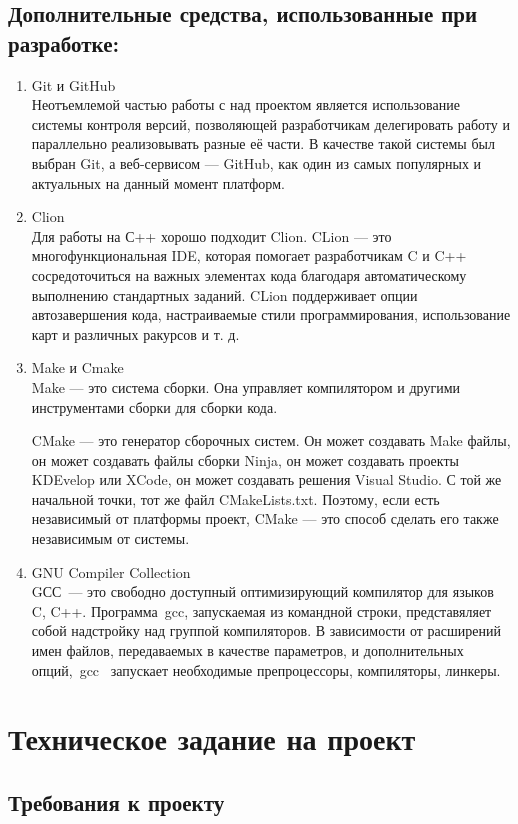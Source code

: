 \documentclass[a4paper,14pt,oneside]{extreport}  %
\begin{document}
\section{Дополнительные средства, использованные при разработке:}
\begin{enumerate}
	\item Git и GitHub\\
	Неотъемлемой частью работы с над проектом является использование системы контроля версий, позволяющей разработчикам делегировать работу и параллельно реализовывать разные её части. В качестве такой системы был выбран Git, а веб-сервисом — GitHub, как один из самых популярных и актуальных на данный момент платформ.
	\item Clion\\
	Для работы на С++ хорошо подходит Clion. CLion — это многофункциональная IDE, которая помогает разработчикам C и C++ сосредоточиться на важных элементах кода благодаря автоматическому выполнению стандартных заданий.  CLion поддерживает опции автозавершения кода, настраиваемые стили программирования, использование карт и различных ракурсов и т. д.
	\item Make и Cmake\\
	Make — это система сборки. Она управляет компилятором и другими инструментами сборки для сборки кода. 
	
	CMake — это генератор сборочных систем. Он может создавать Make файлы, он может создавать файлы сборки Ninja, он может создавать проекты KDEvelop или XCode, он может создавать решения Visual Studio. С той же начальной точки, тот же файл CMakeLists.txt. Поэтому, если есть независимый от платформы проект, CMake — это способ сделать его также независимым от системы. 
	\item GNU Compiler Collection\\
	GСС — это свободно доступный оптимизирующий компилятор для языков C, C++. Программа gcc, запускаемая из командной строки, представяляет собой надстройку над группой компиляторов. В зависимости от расширений имен файлов, передаваемых в качестве параметров, и дополнительных опций, gcc  запускает необходимые препроцессоры, компиляторы, линкеры.
\end{enumerate}

\newpage
\chapter{Техническое задание на проект}
\section{Требования к проекту}
\end{document}
